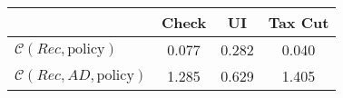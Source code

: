 \begin{tabular}{@{}lccc@{}} 
\toprule 
                          & Check      & UI    & Tax Cut    \\  \midrule 
$\mathcal{C}(Rec,\text{policy})$ & 0.077  & 0.282  & 0.040     \\ 
$\mathcal{C}(Rec, AD,\text{policy})$ & 1.285  & 0.629  & 1.405     \\ 
\end{tabular}  
